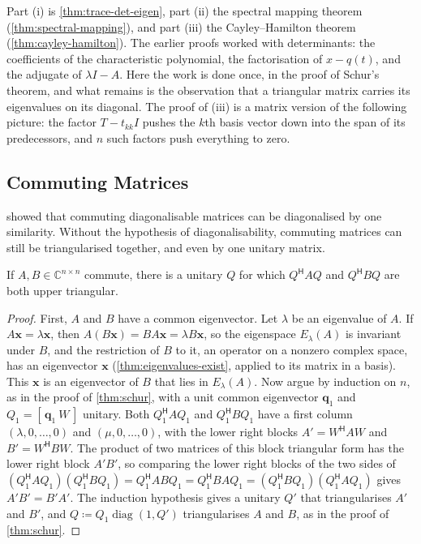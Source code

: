Part (i) is \cref{thm:trace-det-eigen}, part (ii) the spectral mapping theorem (\cref{thm:spectral-mapping}), and part (iii) the Cayley--Hamilton theorem (\cref{thm:cayley-hamilton}). The earlier proofs worked with determinants: the coefficients of the characteristic polynomial, the factorisation of $x-q(t)$, and the adjugate of $\lambda I-A$. Here the work is done once, in the proof of Schur's theorem, and what remains is the observation that a triangular matrix carries its eigenvalues on its diagonal. The proof of (iii) is a matrix version of the following picture: the factor $T-t_{kk}I$ pushes the $k$th basis vector down into the span of its predecessors, and $n$ such factors push everything to zero.

\subsection{Commuting Matrices}

 showed that commuting diagonalisable matrices can be diagonalised by one similarity. Without the hypothesis of diagonalisability, commuting matrices can still be triangularised together, and even by one unitary matrix.

\begin{theorem}
\label{thm:simultaneous-triangular}
If $A,B\in\mathbb C^{n\times n}$ commute, there is a unitary $Q$ for which $Q^{\mathsf H}AQ$ and $Q^{\mathsf H}BQ$ are both upper triangular.
\end{theorem}

\begin{proof}
First, $A$ and $B$ have a common eigenvector. Let $\lambda$ be an eigenvalue of $A$. If $A\mathbf x=\lambda\mathbf x$, then $A(B\mathbf x)=BA\mathbf x=\lambda B\mathbf x$, so the eigenspace $E_\lambda(A)$ is invariant under $B$, and the restriction of $B$ to it, an operator on a nonzero complex space, has an eigenvector $\mathbf x$ (\cref{thm:eigenvalues-exist}, applied to its matrix in a basis). This $\mathbf x$ is an eigenvector of $B$ that lies in $E_\lambda(A)$. Now argue by induction on $n$, as in the proof of \cref{thm:schur}, with a unit common eigenvector $\mathbf q_1$ and $Q_1=[\,\mathbf q_1\ W\,]$ unitary. Both $Q_1^{\mathsf H}AQ_1$ and $Q_1^{\mathsf H}BQ_1$ have a first column $(\lambda,0,\ldots,0)$ and $(\mu,0,\ldots,0)$, with the lower right blocks $A'=W^{\mathsf H}AW$ and $B'=W^{\mathsf H}BW$. The product of two matrices of this block triangular form has the lower right block $A'B'$, so comparing the lower right blocks of the two sides of $(Q_1^{\mathsf H}AQ_1)(Q_1^{\mathsf H}BQ_1)=Q_1^{\mathsf H}ABQ_1=Q_1^{\mathsf H}BAQ_1=(Q_1^{\mathsf H}BQ_1)(Q_1^{\mathsf H}AQ_1)$ gives $A'B'=B'A'$. The induction hypothesis gives a unitary $Q'$ that triangularises $A'$ and $B'$, and $Q\coloneqq Q_1\operatorname{diag}(1,Q')$ triangularises $A$ and $B$, as in the proof of \cref{thm:schur}.
\end{proof}

